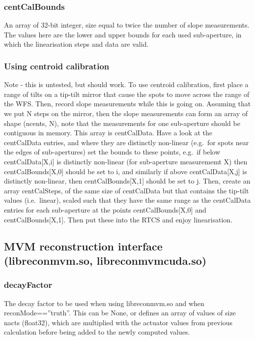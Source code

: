 \documentclass[a4,10pt]{article}
\begin{document}
\subsubsection{centCalBounds}
An array of 32-bit integer, size equal to twice the number of slope
measurements.  The values here are the lower and upper bounds for each
used sub-aperture, in which the linearisation steps and data are valid.

\subsubsection{Using centroid calibration}
Note - this is untested, but should work.  To use centroid
calibration, first place a range of tilts on a tip-tilt mirror that
cause the spots to move across the range of the WFS.  Then, record
slope measurements while this is going on.  Assuming that we put N
steps on the mirror, then the slope measurements can form an array of
shape (ncents, N), note that the measurements for one sub-aperture
should be contiguous in memory.  This array is centCalData.  Have a
look at the centCalData entries, and where they are distinctly
non-linear (e.g.\ for spots near the edges of sub-apertures) set the
bounds to these points, e.g.\ if below centCalData[X,i] is distinctly
non-linear (for sub-aperture measurememt X) then centCalBounds[X,0]
should be set to i, and similarly if above centCalData[X,j] is
distinctly non-linear, then centCalBounds[X,1] should be set to j.
Then, create an array centCalSteps, of the same size of centCalData
but that contains the tip-tilt values (i.e.\ linear), scaled such that
they have the same range as the centCalData entries for each
sub-aperture at the points centCalBounds[X,0] and centCalBounds[X,1].
Then put these into the RTCS and enjoy linearisation.



\subsection{MVM reconstruction interface (libreconmvm.so, libreconmvmcuda.so)}
\subsubsection{decayFactor}
The decay factor to be used when using libreconmvm.so and when
reconMode==''truth''.  This can be None, or defines an array of values
of size nacts (float32), which are multiplied with the actuator values from
previous calculation before being added to the newly computed values.
\end{document}
